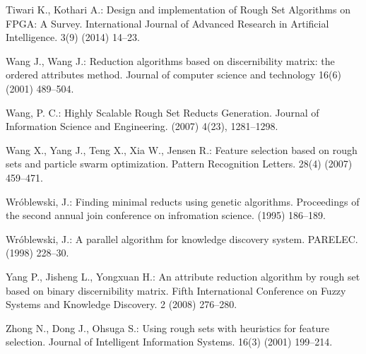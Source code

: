 \documentclass[11pt]{article}   %
\begin{document}
\begin{thebibliography}{}
	Tiwari K., Kothari A.:
	Design and implementation of Rough Set Algorithms on FPGA: A Survey.
	International Journal of Advanced Research in Artificial Intelligence. 3(9) (2014) 14--23.
		
	Wang J., Wang J.:
	Reduction algorithms based on discernibility matrix: the ordered attributes method.
	Journal of computer science and technology 16(6) (2001) 489--504.
	
	Wang, P. C.:
	Highly Scalable Rough Set Reducts Generation. 
	Journal of Information Science and Engineering. (2007) 4(23), 1281--1298.

	Wang X., Yang J., Teng X., Xia W., Jensen R.:
	Feature selection based on rough sets and particle swarm optimization.
	Pattern Recognition Letters. 28(4) (2007) 459--471.
	
	Wr\'oblewski, J.: 
	Finding minimal reducts using genetic algorithms.
	Proceedings of the second annual join conference on infromation science. (1995) 186--189.

	Wr\'oblewski, J.:
	A parallel algorithm for knowledge discovery system.
	PARELEC. (1998) 228--30.

	Yang P., Jisheng L., Yongxuan H.:
	An attribute reduction algorithm by rough set based on binary discernibility matrix.
	Fifth International Conference on Fuzzy Systems and Knowledge Discovery. 2 (2008) 276--280.
	
	Zhong N., Dong J., Ohsuga S.:
	Using rough sets with heuristics for feature selection.
	Journal of Intelligent Information Systems. 16(3) (2001) 199--214.


			
%
%

\end{thebibliography}
\end{document}
